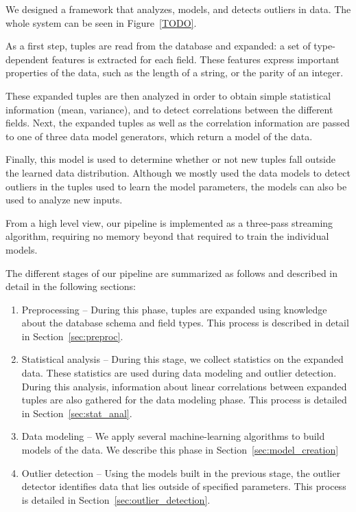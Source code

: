 We designed a framework that analyzes, models, and detects outliers in data.
The whole system can be seen in Figure~\ref{TODO}.

As a first step, tuples are read from the database and expanded: a set of type-dependent features is extracted for each field. These features express important properties of the data, such as the length of a string, or the parity of an integer.

These expanded tuples are then analyzed in order to obtain simple statistical information (mean, variance), and to detect correlations between the different fields. Next, the expanded tuples as well as the correlation information are passed to one of three data model generators, which return a model of the data.

Finally, this model is used to determine whether or not new tuples fall outside the learned data distribution. Although we mostly used the data models to detect outliers in the tuples used to learn the model parameters, the models can also be used to analyze new inputs.

From a high level view, our pipeline is implemented as a three-pass streaming algorithm, requiring no memory beyond that required to train the individual models.

The different stages of our pipeline are summarized as follows and described in detail in the following sections:

\begin{enumerate}
	\item Preprocessing -- During this phase, tuples are expanded using knowledge about the database schema and field types. This process is described in detail in Section~\ref{sec:preproc}.

	\item Statistical analysis -- During this stage, we collect statistics on the expanded data. These statistics are used during data modeling and outlier detection. During this analysis, information about linear correlations between expanded tuples are also gathered for the data modeling phase. This process is detailed in Section~\ref{sec:stat_anal}.
 
	\item Data modeling -- We apply several machine-learning algorithms to build models of the data. We describe this phase in Section~\ref{sec:model_creation}

	\item Outlier detection -- Using the models built in the previous stage, the outlier detector identifies data that lies outside of specified parameters. This process is detailed in Section~\ref{sec:outlier_detection}.
\end{enumerate}

